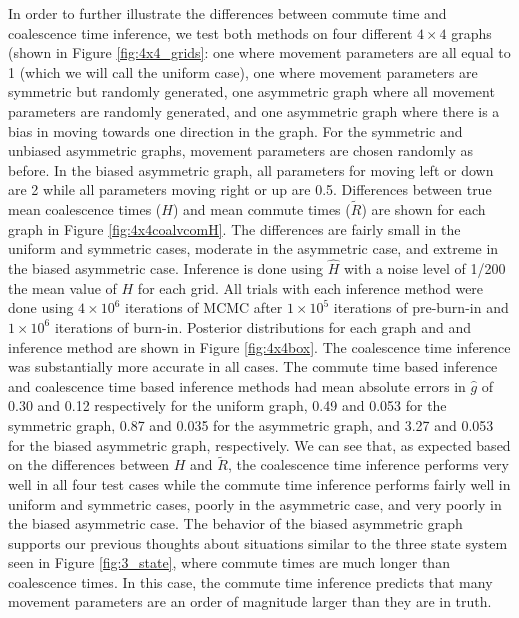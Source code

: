 \documentclass{article}
\newcommand{\comdist}{\widetilde R}
\begin{document}
In order to further illustrate the differences between commute time and coalescence time inference,
we test both methods on four different $4 \times 4$ graphs (shown in Figure \ref{fig:4x4_grids}:
one where movement parameters are all equal to 1 (which we will call the uniform case),
one where movement parameters are symmetric but randomly generated, 
one asymmetric graph where all movement parameters are randomly generated,
and one asymmetric graph where there is a bias in moving towards one direction in the graph.
For the symmetric and unbiased asymmetric graphs, movement parameters are chosen randomly as before.
In the biased asymmetric graph, all parameters for moving left or down are 2 while 
all parameters moving right or up are 0.5.
Differences between true mean coalescence times ($H$) and mean commute times ($\comdist$) 
are shown for each graph in Figure \ref{fig:4x4coalvcomH}. 
The differences are fairly small in the uniform and symmetric cases, moderate in the asymmetric case, 
and extreme in the biased asymmetric case.
Inference is done using $\hat{H}$ with a noise level of 1/200 the mean value of $H$ for each grid.
All trials with each inference method were done using $4 \times 10^6$ iterations of MCMC 
after $1 \times 10^5$  iterations of pre-burn-in and $1 \times 10^6$ iterations of burn-in.
Posterior distributions for each graph and and inference method are shown in Figure \ref{fig:4x4box}.
The coalescence time inference was substantially more accurate in all cases.
The commute time based inference and coalescence time based inference methods had 
mean absolute errors in $\hat{g}$ of 0.30 and 0.12 respectively for the uniform graph,
0.49 and 0.053 for the symmetric graph, 
0.87 and 0.035 for the asymmetric graph,
and 3.27 and 0.053 for the biased asymmetric graph, respectively.
We can see that, as expected based on the differences between $H$ and $\comdist$,
the coalescence time inference performs very well in all four test cases
while the commute time inference performs fairly well in uniform and symmetric cases,
poorly in the asymmetric case, and very poorly in the biased asymmetric case.
The behavior of the biased asymmetric graph supports our previous thoughts about
situations similar to the three state system seen in Figure \ref{fig:3_state},
where commute times are much longer than coalescence times.
In this case, the commute time inference predicts that many movement parameters
are an order of magnitude larger than they are in truth. 
\end{document}
